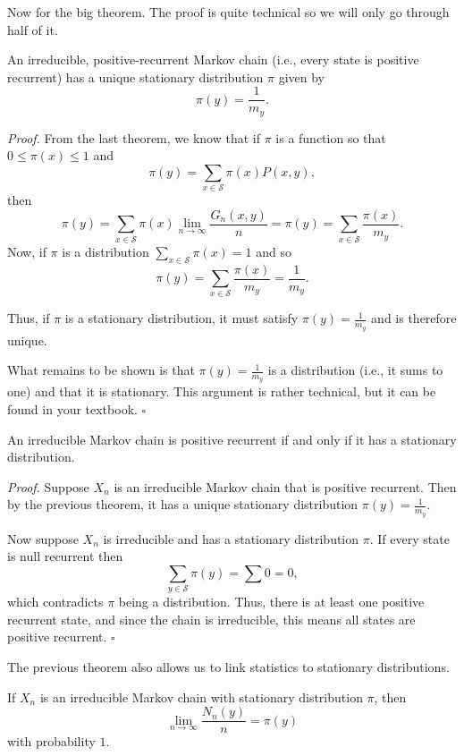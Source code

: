 \documentclass{problemset}
\newcommand{\1}{\mathbf{1}}
\newenvironment{proof}{\emph{Proof.}}{\hfill$\square$}
\begin{document}
	Now for the big theorem.  The proof is quite technical so we will only
	go through half of it.
	\begin{theorem}
		An irreducible, positive-recurrent Markov chain (i.e., every state is positive recurrent)
		has a unique stationary distribution $\pi$ given by
		\[
			\pi(y) = \frac{1}{m_y}.
		\]
	\end{theorem}
	\begin{proof}
		From the last theorem, we know that if $\pi$ is a function so that $0\leq \pi(x)\leq 1$ and
		\[
			\pi(y) = \sum_{x\in\mathcal S} \pi(x)P(x,y),
		\]
		then
		\[
			\pi(y) = \sum_{x\in\mathcal S} \pi(x)\lim_{n\to\infty}\frac{G_n(x,y)}{n}
			=
			\pi(y) = \sum_{x\in\mathcal S} \frac{\pi(x)}{m_y}.
		\]
		Now, if $\pi$ is a distribution $\sum_{x\in\mathcal S} \pi(x)=1$ and so
		\[
			\pi(y) = \sum_{x\in\mathcal S} \frac{\pi(x)}{m_y} = \frac{1}{m_y}.
		\]

		Thus, if $\pi$ is a stationary distribution, it must satisfy $\pi(y)=\frac{1}{m_y}$ and
		is therefore unique.

		What remains to be shown is that $\pi(y)=\frac{1}{m_y}$ is a distribution (i.e., it sums to one)
		and that it is stationary.  This argument is rather technical, but it can be found in your textbook.
	\end{proof}

	\begin{corollary}
		An irreducible Markov chain is positive recurrent if and only if it has a stationary distribution.
	\end{corollary}

	\begin{proof}
		Suppose $X_n$ is an irreducible Markov chain that is positive recurrent.  Then by the previous theorem,
		it has a unique stationary distribution $\pi(y)=\frac{1}{m_y}$.

		Now suppose $X_n$ is irreducible and has a stationary distribution $\pi$.  If every state is null
		recurrent then
		\[
			\sum_{y\in\mathcal S} \pi(y) = \sum 0 = 0,
		\]
		which contradicts $\pi$ being a distribution.  Thus, there is at least one positive recurrent state,
		and since the chain is irreducible, this means all states are positive recurrent.
	\end{proof}

	The previous theorem also allows us to link statistics to stationary distributions.
	\begin{corollary}
		If $X_n$ is an irreducible Markov chain with stationary distribution $\pi$, then
		\[
			\lim_{n\to\infty} \frac{N_n(y)}{n} = \pi(y)
		\]
		with probability $1$.
	\end{corollary}
\end{document}
